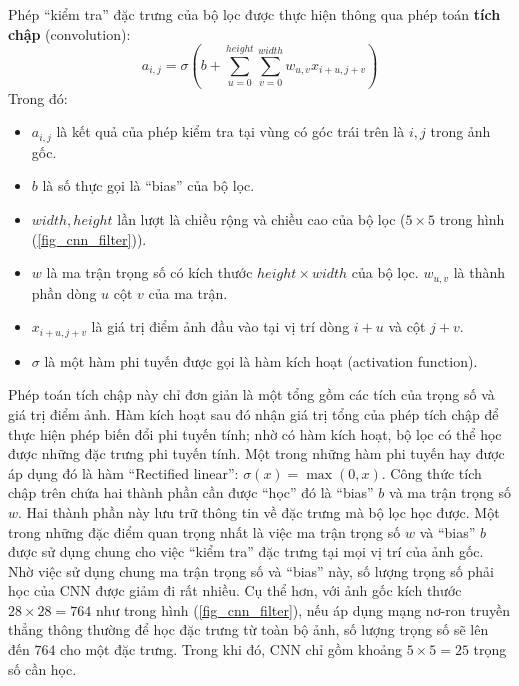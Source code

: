 	Phép ``kiểm tra'' đặc trưng của bộ lọc được thực hiện thông qua phép toán \textbf{tích chập} (convolution):
	\begin{equation}
		a_{i,j} = \sigma \left( b + \sum_{u = 0}^{height} \sum_{v = 0}^{width} w_{u, v} x_{i + u, j + v} \right)
	\end{equation}
	Trong đó:
	\begin{itemize}
		\item $a_{i,j}$ là kết quả của phép kiểm tra tại vùng có góc trái trên là $i, j$ trong ảnh gốc.
		\item $b$ là số thực gọi là ``bias'' của bộ lọc.
		\item $width, height$ lần lượt là chiều rộng và chiều cao của bộ lọc ($5\times5$ trong hình (\ref{fig_cnn_filter})).
		\item $w$ là ma trận trọng số có kích thước $height \times width$ của bộ lọc. 
		$w_{u, v}$ là thành phần dòng $u$ cột $v$ của ma trận.
		\item $x_{i + u, j + v}$ là giá trị điểm ảnh đầu vào tại vị trí dòng $i + u$ và cột $j + v$.
		\item $\sigma$ là một hàm phi tuyến được gọi là hàm kích hoạt (activation function).
	\end{itemize}
	Phép toán tích chập này chỉ đơn giản là một tổng gồm các tích của trọng số và giá trị điểm ảnh.
	Hàm kích hoạt sau đó nhận giá trị tổng của phép tích chập để thực hiện phép biến đổi phi tuyến tính; nhờ có hàm kích hoạt, bộ lọc có thể học được những đặc trưng phi tuyến tính.
	Một trong những hàm phi tuyến hay được áp dụng đó là hàm ``Rectified linear'': $\sigma(x)=\max(0, x)$.
	Công thức tích chập trên chứa hai thành phần cần được ``học'' đó là ``bias'' $b$ và ma trận trọng số $w$.
	Hai thành phần này lưu trữ thông tin về đặc trưng mà bộ lọc học được.
	Một trong những đặc điểm quan trọng nhất là việc ma trận trọng số $w$ và ``bias'' $b$ được sử dụng chung cho việc ``kiểm tra'' đặc trưng tại mọi vị trí của ảnh gốc.
	Nhờ việc sử dụng chung ma trận trọng số và ``bias'' này, số lượng trọng số phải học của CNN được giảm đi rất nhiều.
	Cụ thể hơn, với ảnh gốc kích thước $28\times28 = 764$ như trong hình (\ref{fig_cnn_filter}), nếu áp dụng mạng nơ-ron truyền thẳng thông thường để học đặc trưng từ toàn bộ ảnh, số lượng trọng số sẽ lên đến $764$ cho một đặc trưng.
	Trong khi đó, CNN chỉ gồm khoảng $5\times5=25$ trọng số cần học.
	
